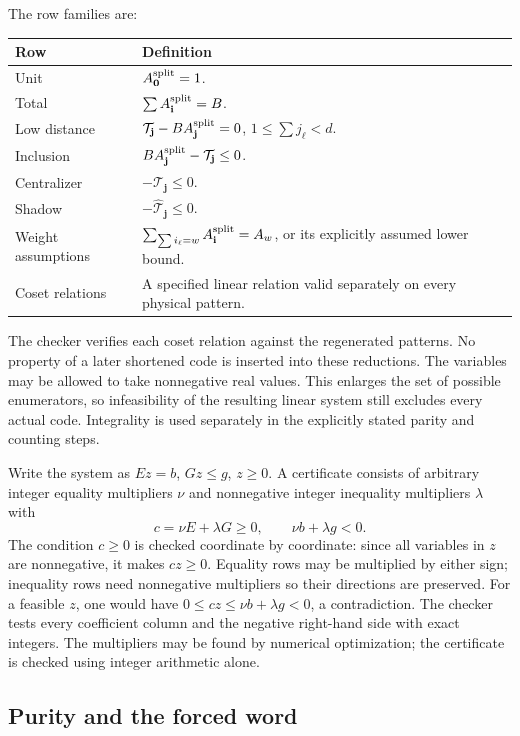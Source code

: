 The row families are:
\begin{center}\small
\begin{tabularx}{\linewidth}{@{}lX@{}}\toprule
Row&Definition\\\midrule
Unit&\(A^{\rm split}_{\mathbf0}=1\).\\
Total&\(\sum A^{\rm split}_{\mathbf i}=B\).\\
Low distance&\(\mathcal T_{\mathbf j}-BA^{\rm split}_{\mathbf j}=0\), \(1\leq\sum j_\ell<d\).\\
Inclusion&\(BA^{\rm split}_{\mathbf j}-\mathcal T_{\mathbf j}\leq0\).\\
Centralizer&\(-\mathcal T_{\mathbf j}\leq0\).\\
Shadow&\(-\widehat{\mathcal T}_{\mathbf j}\leq0\).\\
Weight assumptions&\(\sum_{\sum i_\ell=w}A^{\rm split}_{\mathbf i}=A_w\), or its explicitly assumed lower bound.\\
Coset relations&A specified linear relation valid separately on every physical pattern.\\\bottomrule
\end{tabularx}
\end{center}
The checker verifies each coset relation against the regenerated patterns.
No property of a later shortened code is inserted into these reductions.
The variables may be allowed to take nonnegative real values. This
enlarges the set of possible enumerators, so infeasibility of the
resulting linear system still excludes every actual code. Integrality
is used separately in the explicitly stated parity and counting steps.

Write the system as \(Ez=b\), \(Gz\leq g\), \(z\geq0\).
A certificate consists of arbitrary integer equality multipliers \(\nu\)
and nonnegative integer inequality multipliers \(\lambda\) with
\[
 c=\nu E+\lambda G\geq0,\qquad \nu b+\lambda g<0.
\]
The condition \(c\geq0\) is checked coordinate by coordinate: since
all variables in \(z\) are nonnegative, it makes \(cz\geq0\).
Equality rows may be multiplied by either sign; inequality rows need
nonnegative multipliers so their directions are preserved.
For a feasible \(z\), one would have
\(0\leq cz\leq\nu b+\lambda g<0\), a contradiction.
The checker tests every coefficient column and the negative right-hand side
with exact integers. The multipliers may be found by numerical optimization; the certificate
is checked using integer arithmetic alone.

\subsection{Purity and the forced word}

